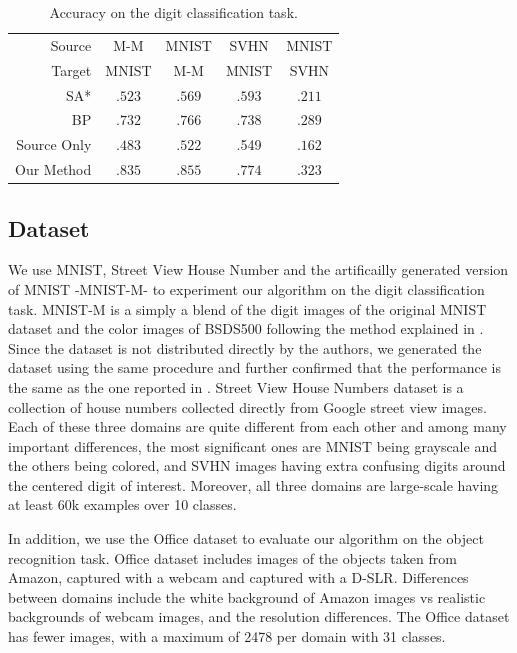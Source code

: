 \begin{table}[ht]
\caption{Accuracy on the digit classification task.}
\label{tab:res2}
\begin{sc}
\begin{small}
\begin{tabular}{@{}r@{\hskip 1mm}c@{\hskip 1mm}c@{\hskip 1mm}c@{\hskip 1mm}c@{}} \toprule 
Source & M-M & MNIST  & SVHN & MNIST \\
Target&  MNIST & M-M & MNIST & SVHN\\
 \midrule
SA* \cite{fernando13}& $.523$ & $.569$ & $.593$ & $.211$ \\
BP \cite{ganin15} &$.732$ & $.766$ & $.738$ & $.289$ \\
\midrule
Source Only  & $.483$ & $.522$  &.549 & $.162$  \\
Our Method & $\mathbf{.835}$ & $\mathbf{.855}$ & $\mathbf{.774}$ & $\mathbf{.323}$\\
 \bottomrule
\end{tabular}
\end{small}
\end{sc}
\end{table}

\subsection{Dataset}
We use MNIST\cite{mnist}, Street View House Number\cite{svhn} and the artificailly generated version of MNIST -MNIST-M- \cite{ganin15} to experiment our algorithm on the digit classification task. MNIST-M is a simply a blend of the digit images of the original MNIST dataset and the color images of BSDS500\cite{bsds500} following the method explained in \cite{ganin15}. Since the dataset is not distributed directly by the authors, we generated the dataset using the same procedure and further confirmed that the performance is the same as the one reported in \cite{ganin15}. Street View House Numbers dataset is a collection of house numbers collected directly from Google street view images. Each of these three domains are quite different from each other and among many important differences, the most significant ones are MNIST being grayscale and the others being colored, and SVHN images having extra confusing digits around the centered digit of interest. Moreover, all three domains are large-scale having at least 60k examples over 10 classes. 

In addition, we use the Office\cite{office} dataset to evaluate our algorithm on the object recognition task. Office dataset includes images of the objects taken from Amazon, captured with a webcam and captured with a D-SLR. Differences between domains include the white background of Amazon images vs realistic backgrounds of webcam images, and the resolution differences. The Office dataset has fewer images, with a maximum of 2478 per domain with 31 classes. %

